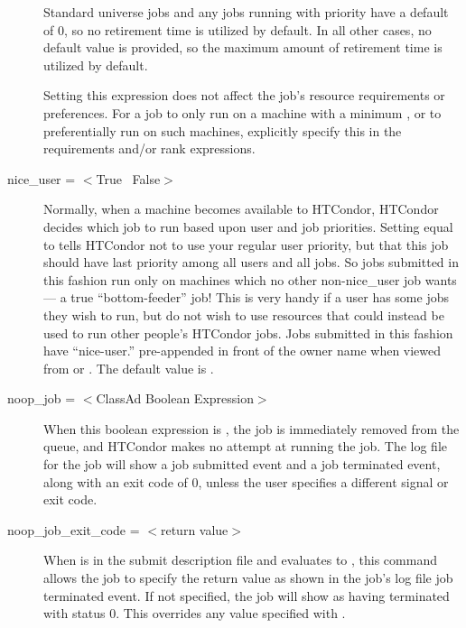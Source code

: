 \begin{description}
Standard universe jobs and any jobs running with 
priority have a default  of 0,
so no retirement time is utilized by default.
In all other cases,
no default value is provided,
so the maximum amount of retirement time is utilized by default.

Setting this expression does not affect the job's resource
requirements or preferences.  
For a job to only run on
a machine with a minimum ,
or to preferentially run on such machines, explicitly
specify this in the requirements and/or rank expressions.


\label{man-condor-submit-nice-user}
\item[nice\_user = $<$True \Bar\ False$>$] Normally, when a machine
becomes available to HTCondor, HTCondor decides which job to run based upon
user and job priorities. Setting  equal to 
tells HTCondor not to use your regular user priority, but that this job
should have last priority among all users and all jobs. So jobs
submitted in this fashion run only on machines which no other
non-nice\_user job wants --- a true ``bottom-feeder'' job! This is very
handy if a user has some jobs they wish to run, but do not wish to use
resources that could instead be used to run other people's HTCondor jobs. Jobs
submitted in this fashion have ``nice-user.'' pre-appended in front of
the owner name when viewed from  or .  The
default value is .


\label{man-condor-submit-noop-job}
\item[noop\_job = $<$ClassAd Boolean Expression$>$]
When this boolean expression is ,
the job is immediately removed from the queue,
and HTCondor makes no attempt at running the job.
The log file for the job will show a
job submitted event and a job terminated event,
along with an exit code of 0,
unless the user specifies a different signal or exit code.


\label{man-condor-submit-noop-job-exit-code}
\item[noop\_job\_exit\_code = $<$return value$>$]
When  is in the submit description file
and evaluates to ,
this command allows the job
to specify the return value as shown in the job's log file
job terminated event.
If not specified, the job will show as having terminated with status 0.
This overrides any value specified with .


\end{description}
